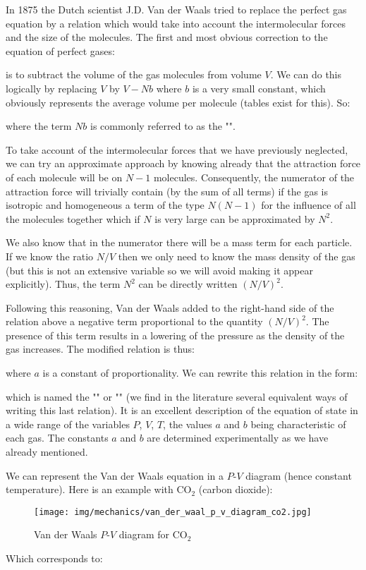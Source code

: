 	In 1875 the Dutch scientist J.D. Van der Waals tried to replace the perfect gas equation by a relation which would take into account the intermolecular forces and the size of the molecules. The first and most obvious correction to the equation of perfect gases:
	
	is to subtract the volume of the gas molecules from volume $V$. We can do this logically by replacing $V$ by $V-Nb$ where $b$ is a very small constant, which obviously represents the average volume per molecule (tables exist for this). So:
	
	where the term $Nb$ is commonly referred to as the "".

	To take account of the intermolecular forces that we have previously neglected, we can try an approximate approach by knowing already that the attraction force of each molecule will be on $N-1$ molecules. Consequently, the numerator of the attraction force will trivially  contain (by the sum of all terms) if the gas is isotropic and homogeneous a term of the type $N (N-1)$ for the influence of all the molecules together which if $N$ is very large can be approximated by $N^2$.
	
	We also know that in the numerator there will be a mass term for each particle. If we know the ratio $N / V$ then we only need to know the mass density of the gas (but this is not an extensive variable so we will avoid making it appear explicitly). Thus, the term $N^2$ can be directly written $(N/V)^2$.

	Following this reasoning, Van der Waals added to the right-hand side of the relation above a negative term proportional to the quantity $(N/V)^2$. The presence of this term results in a lowering of the pressure as the density of the gas increases. The modified relation is thus:
	
	where $a$ is a constant of proportionality. We can rewrite this relation in the form:
	
	which is named the "" or "" (we find in the literature several equivalent ways of writing this last relation). It is an excellent description of the equation of state in a wide range of the variables $P$, $V$, $T$, the values $a$ and $b$ being characteristic of each gas. The constants $a$ and $b$ are determined experimentally as we have already mentioned.

	We can represent the Van der Waals equation in a $P$-$V$ diagram (hence constant temperature). Here is an example with $\mathrm{CO}_2$ (carbon dioxide):
	\begin{figure}[H]
		\centering
		\texttt{[image: img/mechanics/van\_der\_waal\_p\_v\_diagram\_co2.jpg]}
		\caption{Van der Waals $P$-$V$ diagram for $\mathrm{CO}_2$}
	\end{figure}
	Which corresponds to:
	
